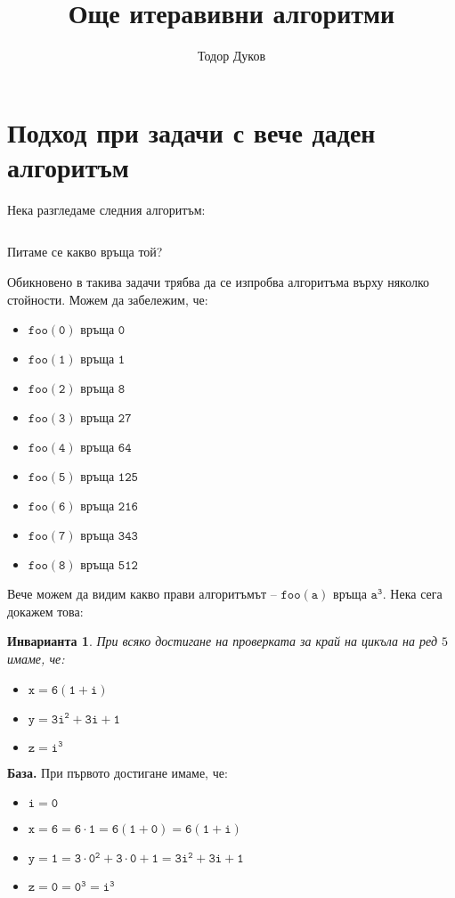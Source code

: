 \documentclass{article}
\title{Още итеравивни алгоритми}
\author{Тодор Дуков}
\date{}
\theoremstyle{definition}
\theoremstyle{plain}
\newtheorem*{invariant}{Инварианта}
\theoremstyle{remark}
\theoremstyle{definition}
\begin{document}
\maketitle

\section*{Подход при задачи с вече даден алгоритъм}

Нека разгледаме следния алгоритъм:
\inputminted[linenos]{c++}{algorithms/foo.cpp}
Питаме се какво връща той?

Обикновено в такива задачи трябва да се изпробва алгоритъма върху няколко стойности.
Можем да забележим, че:
\begin{itemize}
    \item $\mathtt{foo(0) \text{ връща } 0}$
    \item $\mathtt{foo(1) \text{ връща } 1}$
    \item $\mathtt{foo(2) \text{ връща } 8}$
    \item $\mathtt{foo(3) \text{ връща } 27}$
    \item $\mathtt{foo(4) \text{ връща } 64}$
    \item $\mathtt{foo(5) \text{ връща } 125}$
    \item $\mathtt{foo(6) \text{ връща } 216}$
    \item $\mathtt{foo(7) \text{ връща } 343}$
    \item $\mathtt{foo(8) \text{ връща } 512}$
\end{itemize}

Вече можем да видим какво прави алгоритъмът -- $\mathtt{foo(a) \text{ връща } a^3}$.
Нека сега докажем това:
\begin{invariant}
    При всяко достигане на проверката за край на цикъла на ред $5$ имаме, че:
    \begin{itemize}
        \item $\mathtt{x = 6 (1 + i)}$
        \item $\mathtt{y = 3i^2 + 3i + 1}$
        \item $\mathtt{z = i^3}$
    \end{itemize}
\end{invariant}

\textbf{База.}
При първото достигане имаме, че:
\begin{itemize}
    \item $\mathtt{i = 0}$
    \item $\mathtt{x = 6 = 6 \cdot 1 = 6 (1 + 0) = 6 (1 + i)}$
    \item $\mathtt{y = 1 = 3 \cdot 0^2 + 3 \cdot 0 + 1 = 3i^2 + 3i + 1}$
    \item $\mathtt{z = 0 = 0^3 = i^3}$
\end{itemize}
\end{document}
